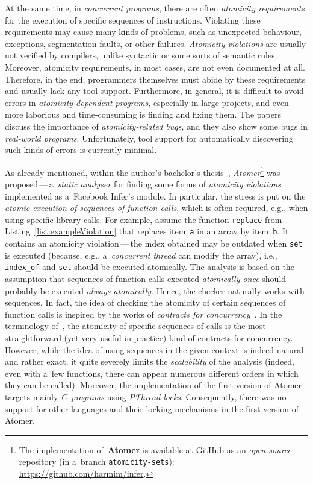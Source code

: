 At the same time, in \emph{concurrent programs}, there are often \emph{atomicity requirements} for the execution of specific sequences of instructions. Violating these requirements may cause many kinds of problems, such as unexpected behaviour, exceptions, segmentation faults, or other failures. \emph{Atomicity violations} are usually not verified by compilers, unlike syntactic or some sorts of semantic rules. Moreover, atomicity requirements, in most cases, are not even documented at all. Therefore, in the end, programmers themselves must abide by these requirements and usually lack any tool support. Furthermore, in general, it is difficult to avoid errors in \emph{atomicity-dependent programs}, especially in large projects, and even more laborious and time-consuming is finding and fixing them. The papers~\cite{contracts2017, atomizer, contracts2015, atomicityOOP} discuss the importance of \emph{atomicity-related bugs}, and they also show some bugs in \emph{real-world programs}. Unfortunately, tool support for automatically discovering such kinds of errors is currently minimal.

As already mentioned, within the author's bachelor's thesis~\cite{harmimBP}, \emph{Atomer}\footnote{The implementation of~\textbf{Atomer} is available at GitHub as an \emph{open-source} repository (in a~branch \texttt{atomicity-sets}): \url{https://github.com/harmim/infer}.} was proposed\,---\,a~\emph{static analyser} for finding some forms of \emph{atomicity violations} implemented as a~Facebook Infer's module. In particular, the stress is put on the \emph{atomic execution of sequences of function calls}, which is often required, e.g., when using specific library calls. For example, assume the function \texttt{replace} from Listing~\ref{list:exampleViolation} that replaces item~\texttt{a} in an array by item~\texttt{b}. It contains an atomicity violation\,---\,the index obtained may be outdated when \texttt{set} is executed (because, e.g., a~\emph{concurrent thread} can modify the array), i.e., \texttt{index\_of} and \texttt{set} should be executed atomically. The analysis is based on the assumption that sequences of function calls executed \emph{atomically once} should probably be executed \emph{always atomically}. Hence, the checker naturally works with sequences. In fact, the idea of checking the atomicity of certain sequences of function calls is inspired by the works of \emph{contracts for concurrency}~\cite{contracts2017, contracts2015}. In the terminology of~\cite{contracts2017, contracts2015}, the atomicity of specific sequences of calls is the most straightforward (yet very useful in practice) kind of contracts for concurrency. However, while the idea of using sequences in the given context is indeed natural and rather exact, it quite severely limits the \emph{scalability} of the analysis (indeed, even with a~few functions, there can appear numerous different orders in which they can be called). Moreover, the implementation of the first version of Atomer targets mainly \emph{C~programs} using \emph{PThread locks}. Consequently, there was no support for other languages and their locking mechanisms in the first version of Atomer.

